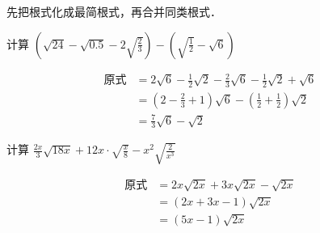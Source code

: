 先把根式化成最简根式，再合并同类根式．

\begin{example}
    计算 $\left(\sqrt{24}-\sqrt{0.5}-2 \sqrt{\frac{2}{3}}\right)-\left(\sqrt{\frac{1}{2}}-\sqrt{6}\right)$
\end{example}

\begin{solution}
    \[\begin{split}
 \text{原式}&= 2 \sqrt{6}-\frac{1}{2} \sqrt{2}-\frac{2}{3} \sqrt{6} -\frac{1}{2} \sqrt{2}+\sqrt{6} \\
 &=\left(2-\frac{2}{3}+1\right) \sqrt{6}-\left(\frac{1}{2}+\frac{1}{2}\right) \sqrt{2} \\
 &=\frac{7}{3} \sqrt{6}-\sqrt{2}     
    \end{split}\]
\end{solution}


\begin{example}
计算 $\frac{2 x}{3} \sqrt{18 x}+12 x \cdot \sqrt{\frac{x}{8}}-x^{2} \sqrt{\frac{2}{x^{3}}}$
\end{example}    

\begin{solution}
    \[\begin{split}
 \text{原式}&=2 x \sqrt{2 x}+3 x \sqrt{2 x}-\sqrt{2 x} \\
 &=(2 x+3 x-1) \sqrt{2 x}\\
 &=(5 x-1) \sqrt{2 x}    
    \end{split}\]
\end{solution}

